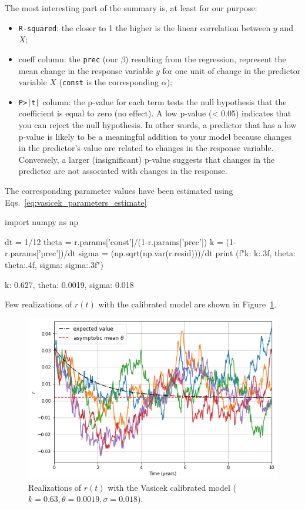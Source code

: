 The most interesting part of the summary is, at least for our purpose: 

\begin{itemize}
\item \texttt{R-squared}: the closer to 1 the higher is the linear correlation between $y$ and $X$;
\item coeff column: the \texttt{prec} (our $\beta$) resulting from the regression, represent the mean change in the response variable $y$ for one unit of change in the predictor variable $X$ (\texttt{const} is the corresponding $\alpha$);
\item  \texttt{P>|t|} column: the p-value for each term tests the null hypothesis that the coefficient is equal to zero (no effect). A low p-value (< 0.05) indicates that you can reject the null hypothesis. In other words, a predictor that has a low p-value is likely to be a meaningful addition to your model because changes in the predictor's value are related to changes in the response variable.
Conversely, a larger (insignificant) p-value suggests that changes in the predictor are not associated with changes in the response.
\end{itemize}

The corresponding parameter values have been estimated using Eqs.~\ref{eq:vasicek_parameters_estimate}
\begin{ipython}
import numpy as np

dt = 1/12
theta = r.params['const']/(1-r.params['prec'])
k = (1-r.params['prec'])/dt
sigma = (np.sqrt(np.var(r.resid)))/dt
print (f"k: {k:.3f}, theta: {theta:.4f}, sigma: {sigma:.3f}")
\end{ipython}
\begin{ioutput}
k: 0.627, theta: 0.0019, sigma: 0.018
\end{ioutput}
Few realizations of $r(t)$ with the calibrated model are shown in Figure~\ref{fig:vasicek_calibrated_paths}.

\begin{figure}[htb]
\centering
\includegraphics[width=0.7\linewidth]{figures/vasicek_calibrated_paths}
\caption{Realizations of $r(t)$ with the Vasicek calibrated model ($k=0.63, \theta=0.0019, \sigma=0.018$).}
\label{fig:vasicek_calibrated_paths}
\end{figure}

